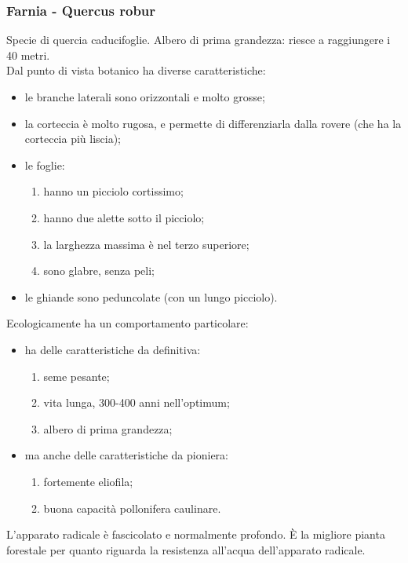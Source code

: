 \subsubsection{Farnia - Quercus robur}
Specie di quercia caducifoglie. Albero di prima grandezza: riesce a raggiungere i 40 metri.\\
Dal punto di vista botanico ha diverse caratteristiche:
\begin{itemize}[nosep]
    \item le branche laterali sono orizzontali e molto grosse;
    \item la corteccia è molto rugosa, e permette di differenziarla dalla rovere (che ha la corteccia più liscia);
    \item le foglie:
    \begin{enumerate}[nosep]
        \item hanno un picciolo cortissimo;
        \item hanno due alette sotto il picciolo;
        \item la larghezza massima è nel terzo superiore;
        \item sono glabre, senza peli;
    \end{enumerate}
        \item le ghiande sono peduncolate (con un lungo picciolo).
\end{itemize}
Ecologicamente ha un comportamento particolare: 
\begin{itemize}[nosep]
    \item ha delle caratteristiche da definitiva:
    \begin{enumerate}[nosep]
        \item seme pesante;
        \item vita lunga, 300-400 anni nell'optimum;
        \item albero di prima grandezza;
    \end{enumerate}
    \item ma anche delle caratteristiche da pioniera:
    \begin{enumerate}[nosep]
        \item fortemente eliofila;
        \item buona capacità pollonifera caulinare.
    \end{enumerate}
\end{itemize}
L'apparato radicale è fascicolato e normalmente profondo. È la migliore pianta forestale per quanto riguarda la resistenza all'acqua dell'apparato radicale.\\
